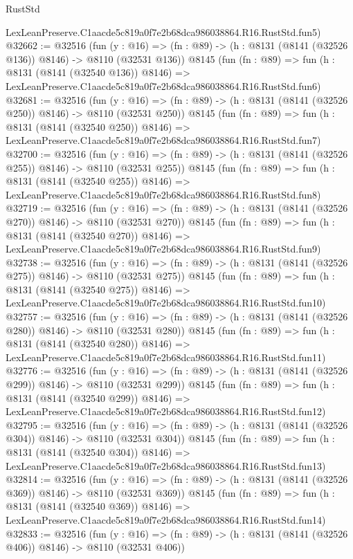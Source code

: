 \begin{lexlean}{RustStd}
\begin{coremodule}
    LexLeanPreserve.C1aacde5c819a0f7e2b68dca986038864.R16.RustStd.fun5)
@32662 := @32516
    (fun (y : @16) => (fn : @89) -> (h : @8131 (@8141 (@32526 @136)) @8146) -> @8110 (@32531 @136))
    @8145
    (fun (fn : @89) =>
    fun (h : @8131 (@8141 (@32540 @136)) @8146) =>
    LexLeanPreserve.C1aacde5c819a0f7e2b68dca986038864.R16.RustStd.fun6)
@32681 := @32516
    (fun (y : @16) => (fn : @89) -> (h : @8131 (@8141 (@32526 @250)) @8146) -> @8110 (@32531 @250))
    @8145
    (fun (fn : @89) =>
    fun (h : @8131 (@8141 (@32540 @250)) @8146) =>
    LexLeanPreserve.C1aacde5c819a0f7e2b68dca986038864.R16.RustStd.fun7)
@32700 := @32516
    (fun (y : @16) => (fn : @89) -> (h : @8131 (@8141 (@32526 @255)) @8146) -> @8110 (@32531 @255))
    @8145
    (fun (fn : @89) =>
    fun (h : @8131 (@8141 (@32540 @255)) @8146) =>
    LexLeanPreserve.C1aacde5c819a0f7e2b68dca986038864.R16.RustStd.fun8)
@32719 := @32516
    (fun (y : @16) => (fn : @89) -> (h : @8131 (@8141 (@32526 @270)) @8146) -> @8110 (@32531 @270))
    @8145
    (fun (fn : @89) =>
    fun (h : @8131 (@8141 (@32540 @270)) @8146) =>
    LexLeanPreserve.C1aacde5c819a0f7e2b68dca986038864.R16.RustStd.fun9)
@32738 := @32516
    (fun (y : @16) => (fn : @89) -> (h : @8131 (@8141 (@32526 @275)) @8146) -> @8110 (@32531 @275))
    @8145
    (fun (fn : @89) =>
    fun (h : @8131 (@8141 (@32540 @275)) @8146) =>
    LexLeanPreserve.C1aacde5c819a0f7e2b68dca986038864.R16.RustStd.fun10)
@32757 := @32516
    (fun (y : @16) => (fn : @89) -> (h : @8131 (@8141 (@32526 @280)) @8146) -> @8110 (@32531 @280))
    @8145
    (fun (fn : @89) =>
    fun (h : @8131 (@8141 (@32540 @280)) @8146) =>
    LexLeanPreserve.C1aacde5c819a0f7e2b68dca986038864.R16.RustStd.fun11)
@32776 := @32516
    (fun (y : @16) => (fn : @89) -> (h : @8131 (@8141 (@32526 @299)) @8146) -> @8110 (@32531 @299))
    @8145
    (fun (fn : @89) =>
    fun (h : @8131 (@8141 (@32540 @299)) @8146) =>
    LexLeanPreserve.C1aacde5c819a0f7e2b68dca986038864.R16.RustStd.fun12)
@32795 := @32516
    (fun (y : @16) => (fn : @89) -> (h : @8131 (@8141 (@32526 @304)) @8146) -> @8110 (@32531 @304))
    @8145
    (fun (fn : @89) =>
    fun (h : @8131 (@8141 (@32540 @304)) @8146) =>
    LexLeanPreserve.C1aacde5c819a0f7e2b68dca986038864.R16.RustStd.fun13)
@32814 := @32516
    (fun (y : @16) => (fn : @89) -> (h : @8131 (@8141 (@32526 @369)) @8146) -> @8110 (@32531 @369))
    @8145
    (fun (fn : @89) =>
    fun (h : @8131 (@8141 (@32540 @369)) @8146) =>
    LexLeanPreserve.C1aacde5c819a0f7e2b68dca986038864.R16.RustStd.fun14)
@32833 := @32516
    (fun (y : @16) => (fn : @89) -> (h : @8131 (@8141 (@32526 @406)) @8146) -> @8110 (@32531 @406))

\end{coremodule}
\end{lexlean}
